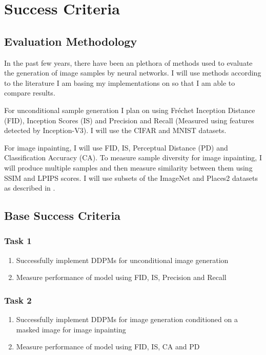 \documentclass{article}
\begin{document}
\newpage
\section{Success Criteria}

\subsection{Evaluation Methodology}

In the past few years, there have been an plethora of methods used to evaluate the generation of image samples by neural networks. I will use methods according to the literature I am basing my implementations on so that I am able to compare results.

For unconditional sample generation I plan on using Fréchet Inception Distance (FID), Inception Scores (IS) and Precision and Recall (Measured using features detected by Inception-V3). I will use the CIFAR and MNIST datasets.

For image inpainting, I will use FID, IS, Perceptual Distance (PD) and Classification Accuracy (CA). To measure sample diversity for image inpainting, I will produce multiple samples and then measure similarity between them using SSIM and LPIPS scores. I will use subsets of the ImageNet and Places2 datasets as described in \cite{Saharia-2022}.

\subsection{Base Success Criteria}

\subsubsection{Task 1}

\begin{enumerate}
    \item Successfully implement DDPMs for unconditional image generation
    \item Measure performance of model using FID, IS, Precision and Recall
\end{enumerate}

\subsubsection{Task 2}
\begin{enumerate}
    \item Successfully implement DDPMs for image generation conditioned on a masked image for image inpainting
    \item Measure performance of model using FID, IS, CA and PD
\end{enumerate}
\end{document}
